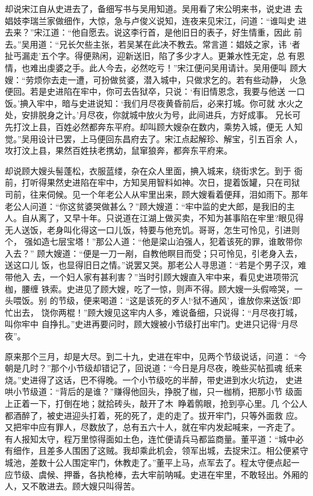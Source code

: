 却说宋江自从史进去了，备细写书与吴用知道。吴用看了宋公明来书，说史进
去娼妓李瑞兰家做细作，大惊，急与卢俊义说知，连夜来见宋江，问道：“谁叫史
进去来？”宋江道：“他自愿去。说这李行首，是他旧日的表子，好生情重，因此
前去。”吴用道：“兄长欠些主张，若吴某在此决不教去。常言道：娼妓之家，讳
‘者扯丐漏走’五个字。得便熟闲，迎新送旧，陷了多少才人。更兼水性无定，总
有恩情，也难出虔婆之手。此人今去，必然吃亏！”宋江便问吴用请计。吴用便叫
顾大嫂：“劳烦你去走一遭，可扮做贫婆，潜入城中，只做求乞的。若有些动静，
火急便回。若是史进陷在牢中，你可去告狱卒，只说：‘有旧情恩念，我要与他送
一口饭。’捵入牢中，暗与史进说知：‘我们月尽夜黄昏前后，必来打城。你可就
水火之处，安排脱身之计。’月尽夜，你就城中放火为号，此间进兵，方好成事。
兄长可先打汶上县，百姓必然都奔东平府。却叫顾大嫂杂在数内，乘势入城，便无
人知觉。”吴用设计已罢，上马便回东昌府去了。宋江点起解珍、解宝，引五百余
人，攻打汶上县，果然百姓扶老携幼，鼠窜狼奔，都奔东平府来。

却说顾大嫂头髻蓬松，衣服蓝缕，杂在众人里面，捵入城来，绕街求乞。到于
衙前，打听得果然史进陷在牢中，方知吴用智料如神。次日，提着饭罐，只在司狱
司前，往来伺候。见一个年老公人从牢里出来，顾大嫂看着便拜，泪如雨下。那年
老公人问道：“你这贫婆哭做甚么？”顾大嫂道：“牢中监的史大郎，是我旧的主
人。自从离了，又早十年。只说道在江湖上做买卖，不知为甚事陷在牢里?眼见得
无人送饭，老身叫化得这一口儿饭，特要与他充饥。哥哥，怎生可怜见，引进则个，
强如造七层宝塔！”那公人道：“他是梁山泊强人，犯着该死的罪，谁敢带你入去？”
顾大嫂道：“便是一刀一剐，自教他瞑目而受；只可怜见，引老身入去，送这口儿
饭，也显得旧日之情。”说罢又哭。那老公人寻思道：“若是个男子汉，难带他入
去，一个妇人家有甚利害？”当时引顾大嫂直入牢中来，看见史进项带沉枷，腰缠
铁索。史进见了顾大嫂，吃了一惊，则声不得。顾大嫂一头假啼哭，一头喂饭。别
的节级，便来喝道：“这是该死的歹人!‘狱不通风’，谁放你来送饭?即忙出去，
饶你两棍！”顾大嫂见这牢内人多，难说备细，只说得：“月尽夜打城，叫你牢中
自挣扎。”史进再要问时，顾大嫂被小节级打出牢门。史进只记得“月尽夜”。

原来那个三月，却是大尽。到二十九，史进在牢中，见两个节级说话，问道：
“今朝是几时？”那个小节级却错记了，回说道：“今日是月尽夜，晚些买帖孤魂
纸来烧。”史进得了这话，巴不得晚。一个小节级吃的半醉，带史进到水火坑边，
史进哄小节级道：“背后的是谁？”赚得他回头，挣脱了枷，只一枷梢，把那小节
级面上正着一下，打倒在地；就拾砖头，敲开了木，睁着鹘眼，抢到亭心里。几
个公人都酒醉了，被史进迎头打着，死的死了，走的走了。拔开牢门，只等外面救
应。又把牢中应有罪人，尽数放了，总有五六十人，就在牢内发起喊来，一齐走了。
有人报知太守，程万里惊得面如土色，连忙便请兵马都监商量。董平道：“城中必
有细作，且差多人围困了这贼。我却乘此机会，领军出城，去捉宋江。相公便紧守
城池，差数十公人围定牢门，休教走了。”董平上马，点军去了。程太守便点起一
应节级、虞候、押番，各执枪棒，去大牢前呐喊。史进在牢里，不敢轻出。外厢的
人，又不敢进去。顾大嫂只叫得苦。

